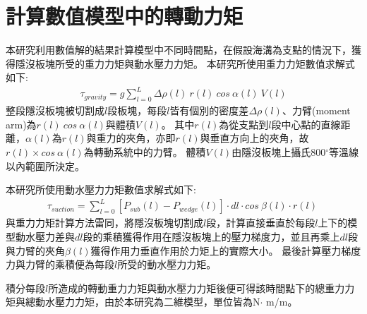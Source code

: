 \section{計算數值模型中的轉動力矩}\label{計算數值模型中的轉動力矩}
本研究利用數值解的結果計算模型中不同時間點，在假設海溝為支點的情況下，獲得隱沒板塊所受的重力力矩與動水壓力力矩。
本研究所使用重力力矩數值求解式如下:
\begin{align}
    \tau_{gravity} =  g\sum ^L_{l=0} \Delta \rho(l)\ r(l)\ cos\ \alpha (l)\ V(l) 
    \label{eqn:tau_gravity}
\end{align}
整段隱沒板塊被切割成$l$段板塊，每段$l$皆有個別的密度差$\Delta \rho(l)$、力臂(moment arm)為$r(l)\ cos\ \alpha (l)$與體積$V(l)$。
其中$r(l)$為從支點到$l$段中心點的直線距離，$ \alpha (l)$為$r(l)$與重力的夾角，亦即$r(l)$與垂直方向上的夾角，故$r(l)\times cos\ \alpha (l)$為轉動系統中的力臂。
體積$V(l)$由隱沒板塊上攝氏800$^{\circ}$等溫線以內範圍所決定。

本研究所使用動水壓力力矩數值求解式如下:
\begin{align}
    \tau_{suction} =  \sum ^L_{l=0} [P_{sub}(l)-P_{wedge}(l)]\cdot dl \cdot cos\ \beta(l)\cdot r(l)\ 
    \label{eqn:tau_suction}
\end{align}
與重力力矩計算方法雷同，將隱沒板塊切割成$l$段，計算直接垂直於每段$l$上下的模型動水壓力差與$dl$段的乘積獲得作用在隱沒板塊上的壓力梯度力，並且再乘上$dl$段與力臂的夾角$\beta(l)$獲得作用力垂直作用於力矩上的實際大小。
最後計算壓力梯度力與力臂的乘積便為每段$l$所受的動水壓力力矩。

積分每段$l$所造成的轉動重力力矩與動水壓力力矩後便可得該時間點下的總重力力矩與總動水壓力力矩，由於本研究為二維模型，單位皆為N$\cdot$ m/m。


